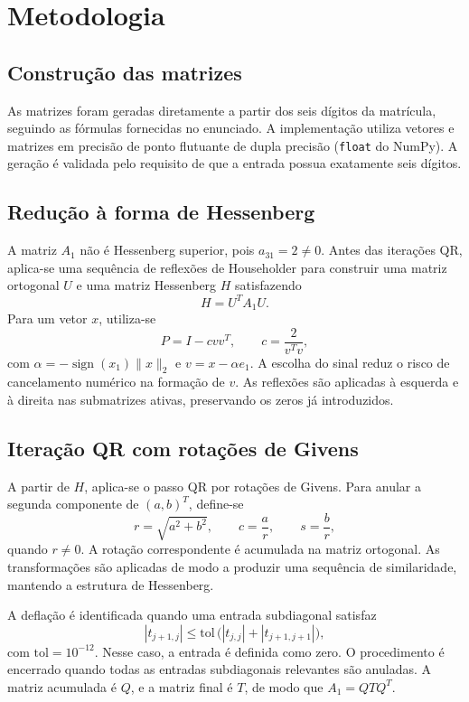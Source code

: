 \section{Metodologia}

\subsection{Construção das matrizes}

As matrizes foram geradas diretamente a partir dos seis dígitos da matrícula, seguindo as fórmulas fornecidas no enunciado. A implementação utiliza vetores e matrizes em precisão de ponto flutuante de dupla precisão (\texttt{float} do NumPy). A geração é validada pelo requisito de que a entrada possua exatamente seis dígitos.

\subsection{Redução à forma de Hessenberg}

A matriz \(A_1\) não é Hessenberg superior, pois \(a_{31}=2\neq0\). Antes das iterações QR, aplica-se uma sequência de reflexões de Householder para construir uma matriz ortogonal \(U\) e uma matriz Hessenberg \(H\) satisfazendo
\[
H=U^TA_1U.
\]
Para um vetor \(x\), utiliza-se
\[
P=I-cvv^T,\qquad c=\frac{2}{v^Tv},
\]
com \(\alpha=-\operatorname{sign}(x_1)\|x\|_2\) e \(v=x-\alpha e_1\). A escolha do sinal reduz o risco de cancelamento numérico na formação de \(v\). As reflexões são aplicadas à esquerda e à direita nas submatrizes ativas, preservando os zeros já introduzidos.

\subsection{Iteração QR com rotações de Givens}

A partir de \(H\), aplica-se o passo QR por rotações de Givens. Para anular a segunda componente de \((a,b)^T\), define-se
\[
r=\sqrt{a^2+b^2},\qquad c=\frac{a}{r},\qquad s=\frac{b}{r},
\]
quando \(r\neq0\). A rotação correspondente é acumulada na matriz ortogonal. As transformações são aplicadas de modo a produzir uma sequência de similaridade, mantendo a estrutura de Hessenberg.

A deflação é identificada quando uma entrada subdiagonal satisfaz
\[
|t_{j+1,j}|\leq \mathrm{tol}\,
\bigl(|t_{j,j}|+|t_{j+1,j+1}|\bigr),
\]
com \(\mathrm{tol}=10^{-12}\). Nesse caso, a entrada é definida como zero. O procedimento é encerrado quando todas as entradas subdiagonais relevantes são anuladas. A matriz acumulada é \(Q\), e a matriz final é \(T\), de modo que \(A_1=QTQ^T\).

